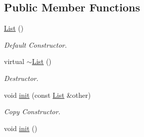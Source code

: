\subsection*{Public Member Functions}
\begin{DoxyCompactItemize}
\item 
\hyperlink{classDE_1_1List_a974c70fe288f5bc78f7769c2311c3716}{List} ()\hypertarget{classDE_1_1List_a974c70fe288f5bc78f7769c2311c3716}{}\label{classDE_1_1List_a974c70fe288f5bc78f7769c2311c3716}

\begin{DoxyCompactList}\small\item\em Default Constructor. \end{DoxyCompactList}\item 
virtual \hyperlink{classDE_1_1List_a8d127e89a4a6b79bbd901bd5ad40033c}{$\sim$\+List} ()\hypertarget{classDE_1_1List_a8d127e89a4a6b79bbd901bd5ad40033c}{}\label{classDE_1_1List_a8d127e89a4a6b79bbd901bd5ad40033c}

\begin{DoxyCompactList}\small\item\em Destructor. \end{DoxyCompactList}\item 
void \hyperlink{classDE_1_1List_a939e1492cec40a32f386fbc3bfd3aad4}{init} (const \hyperlink{classDE_1_1List}{List} \&other)
\begin{DoxyCompactList}\small\item\em Copy Constructor. \end{DoxyCompactList}\item 
void \hyperlink{classDE_1_1List_aaeced6c65cd99370cf78a19ba5f33d79}{init} ()\hypertarget{classDE_1_1List_aaeced6c65cd99370cf78a19ba5f33d79}{}\label{classDE_1_1List_aaeced6c65cd99370cf78a19ba5f33d79}


\end{DoxyCompactItemize}

